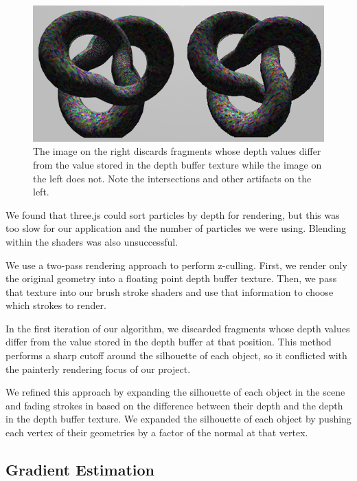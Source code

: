 \documentclass[conference]{acmsiggraph}
\begin{document}
\begin{figure}[ht] %
  \centering
  \includegraphics[width=6.0in]{images/torus_depth_test_demo}
  \caption{The image on the right discards fragments whose depth values differ
           from the value stored in the depth buffer texture while the image on
           the left does not. Note the intersections and other artifacts on the
           left.}
\end{figure}

We found that three.js could sort particles by depth for rendering, but this
was too slow for our application and the number of particles we were using.
Blending within the shaders was also unsuccessful.

We use a two-pass rendering approach to perform z-culling. First, we render
only the original geometry into a floating point depth buffer texture. Then, we
pass that texture into our brush stroke shaders and use that information to
choose which strokes to render.

In the first iteration of our algorithm, we discarded fragments whose depth
values differ from the value stored in the depth buffer at that position. This
method performs a sharp cutoff around the silhouette of each object, so it
conflicted with the painterly rendering focus of our project.

We refined this approach by expanding the silhouette of each object in the
scene and fading strokes in based on the difference between their depth and the
depth in the depth buffer texture. We expanded the silhouette of each object by
pushing each vertex of their geometries by a factor of the normal at that
vertex.

\subsection{Gradient Estimation}
\end{document}
